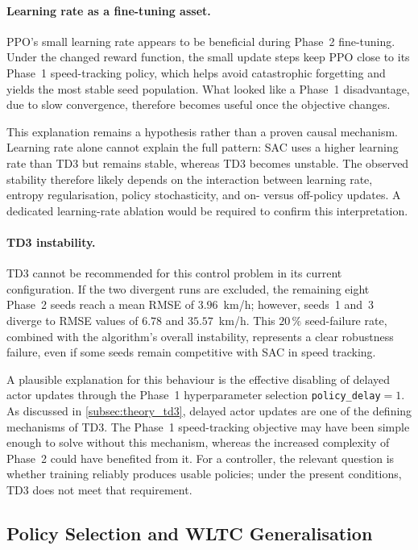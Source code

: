 \paragraph{Learning rate as a fine-tuning asset.}
PPO's small learning rate appears to be beneficial during Phase~2 fine-tuning. Under the changed reward function, the small update steps keep PPO close to its Phase~1 speed-tracking policy, which helps avoid catastrophic forgetting and yields the most stable seed population. What looked like a Phase~1 disadvantage, due to slow convergence, therefore becomes useful once the objective changes.

This explanation remains a hypothesis rather than a proven causal mechanism. Learning rate alone cannot explain the full pattern: SAC uses a higher learning rate than TD3 but remains stable, whereas TD3 becomes unstable. The observed stability therefore likely depends on the interaction between learning rate, entropy regularisation, policy stochasticity, and on- versus off-policy updates. A dedicated learning-rate ablation would be required to confirm this interpretation.

\paragraph{TD3 instability.}
\ac{TD3} cannot be recommended for this control problem in its current configuration. If the two divergent runs are excluded, the remaining eight Phase~2 seeds reach a mean \ac{RMSE} of $3.96$~km/h; however, seeds~1 and~3 diverge to \ac{RMSE} values of $6.78$ and $35.57$~km/h. This $20\,\%$ seed-failure rate, combined with the algorithm's overall instability, represents a clear robustness failure, even if some seeds remain competitive with SAC in speed tracking.

A plausible explanation for this behaviour is the effective disabling of delayed actor updates through the Phase~1 hyperparameter selection \texttt{policy\_delay}$=1$. As discussed in \autoref{subsec:theory_td3}, delayed actor updates are one of the defining mechanisms of \ac{TD3}. The Phase~1 speed-tracking objective may have been simple enough to solve without this mechanism, whereas the increased complexity of Phase~2 could have benefited from it. For a controller, the relevant question is whether training reliably produces usable policies; under the present conditions, TD3 does not meet that requirement.

\subsection{Policy Selection and WLTC Generalisation}

